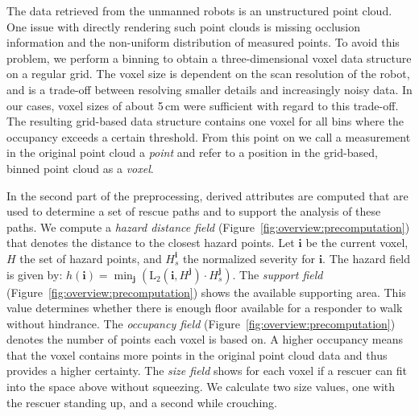 \documentclass{egpubl}
\begin{document}

 The data retrieved from the unmanned robots is an unstructured point cloud. One issue with directly rendering such point clouds is missing occlusion information and the non-uniform distribution of measured points. To avoid this problem, we perform a binning to obtain a three-dimensional voxel data structure on a regular grid. The voxel size is dependent on the scan resolution of the robot, and is a trade-off between resolving smaller details and increasingly noisy data. In our cases, voxel sizes of about 5\,cm were sufficient with regard to this trade-off. The resulting grid-based data structure contains one voxel for all bins where the occupancy exceeds a certain threshold. From this point on we call a measurement in the original point cloud a \emph{point} and refer to a position in the grid-based, binned point cloud as a \emph{voxel}.

 In the second part of the preprocessing, derived attributes are computed that are used to determine a set of rescue paths and to support the analysis of these paths. We compute a \emph{hazard distance field} (Figure~\ref{fig:overview:precomputation}) that denotes the distance to the closest hazard points. Let $\mathbf{i}$ be the current voxel, $H$ the set of hazard points, and $H^{\mathbf{i}}_s$ the normalized severity for $\mathbf{i}$. The hazard field is given by: $h(\mathbf{i}) = \min_\mathbf{j}(\mathrm{L}_2(\mathbf{i}, H^\mathbf{j}) \cdot H^\mathbf{j}_s)$. The \emph{support field} (Figure~\ref{fig:overview:precomputation}) shows the available supporting area. This value determines whether there is enough floor available for a responder to walk without hindrance. The \emph{occupancy field} (Figure~\ref{fig:overview:precomputation}) denotes the number of points each voxel is based on. A higher occupancy means that the voxel contains more points in the original point cloud data and thus provides a higher certainty. The \emph{size field} shows for each voxel if a rescuer can fit into the space above without squeezing. We calculate two size values, one with the rescuer standing up, and a second while crouching.
\end{document}

